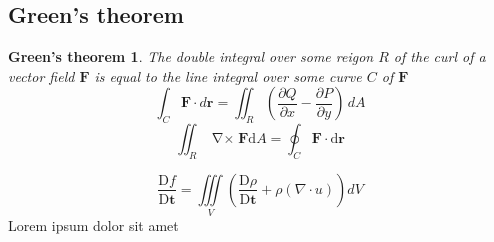 \documentclass[a4paper, 12pt]{article} %
\newcommand{\fatf}{\mathbf{F}} %
\newcommand{\materialder}[2]{\frac{\mathrm{D} #1}{\mathrm{D} #2}} %
\DeclareMathOperator{\curl}{\nabla\times} %
\newtheorem{greenstheorem}{Green's theorem}
\begin{document}
\subsection{Green's theorem}\label{sec:greenstheorem}
\begin{greenstheorem}
	The double integral over some reigon $R$ of the curl of a vector field $\fatf$ is equal to the line integral over some curve $C$ of $\fatf$
	$$\int_C \mathbf{F} \cdot d\mathbf{r} = \iint_R \left( \frac{\partial Q}{\partial x} - \frac{\partial P}{\partial y} \right) \, dA$$
	$$\iint_R\curl\fatf\mathrm{d}A=\oint_C\fatf\cdot\mathrm{d}\mathbf{r}$$
\end{greenstheorem}
\begin{equation} %
	\materialder{f}{\mathbf{t}}=\iiint\limits_{V}(\materialder{\rho}{\mathbf{t}}+\rho(\nabla\cdot u))dV
\end{equation}
Lorem ipsum dolor sit amet \cite{peyret2012computational}

\newpage


\renewcommand{\listfigurename}{\thesection\hspace{20pt}List of Figures}\listoffigures
\end{document}
